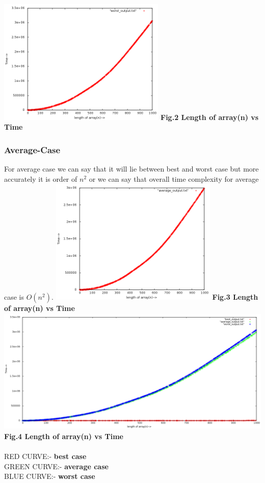 \documentclass[conference]{IEEEtran}
\begin{document}
 \includegraphics[height =  6.00cm,width = \linewidth]{worst.png}
 \textbf{Fig.2 Length of array(n) vs  Time}\\
\subsubsection{\textbf{Average-Case}} 
For average case we can say that it will lie between best and worst case but more accurately it is order of $n^2$ or we can say that overall time complexity for average case is $O(n^2)$.
\includegraphics[height =  6.00cm,width = \linewidth]{average.png}
\textbf{Fig.3 Length of array(n) vs  Time}\\
\includegraphics[height =  6.00cm,width = \linewidth]{all.png}
\textbf{Fig.4 Length of array(n) vs  Time}\\\\
RED CURVE:- \textbf{best case}\\
GREEN CURVE:- \textbf{average case}\\
BLUE CURVE:- \textbf{worst case}
\end{document}
